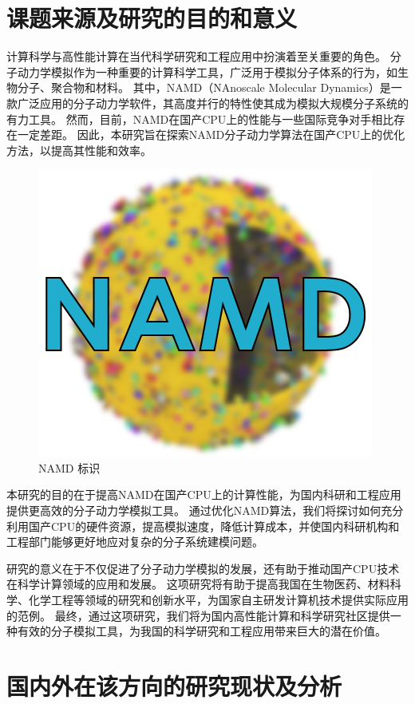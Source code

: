 \section{课题来源及研究的目的和意义}

计算科学与高性能计算在当代科学研究和工程应用中扮演着至关重要的角色。
分子动力学模拟作为一种重要的计算科学工具，广泛用于模拟分子体系的行为，如生物分子、聚合物和材料。
其中，NAMD（NAnoscale Molecular Dynamics）\cite{phillips2005scalable}是一款广泛应用的分子动力学软件，其高度并行的特性使其成为模拟大规模分子系统的有力工具。
然而，目前，NAMD在国产CPU上的性能与一些国际竞争对手相比存在一定差距。
因此，本研究旨在探索NAMD分子动力学算法在国产CPU上的优化方法，以提高其性能和效率。

\begin{figure}[h]
    \centering
    \includegraphics{images/namd-logo.png}
    \caption{NAMD 标识}
\end{figure}

本研究的目的在于提高NAMD在国产CPU上的计算性能，为国内科研和工程应用提供更高效的分子动力学模拟工具。
通过优化NAMD算法，我们将探讨如何充分利用国产CPU的硬件资源，提高模拟速度，降低计算成本，并使国内科研机构和工程部门能够更好地应对复杂的分子系统建模问题。

研究的意义在于不仅促进了分子动力学模拟的发展，还有助于推动国产CPU技术在科学计算领域的应用和发展。
这项研究将有助于提高我国在生物医药、材料科学、化学工程等领域的研究和创新水平，为国家自主研发计算机技术提供实际应用的范例。
最终，通过这项研究，我们将为国内高性能计算和科学研究社区提供一种有效的分子模拟工具，为我国的科学研究和工程应用带来巨大的潜在价值。

\section{国内外在该方向的研究现状及分析}

